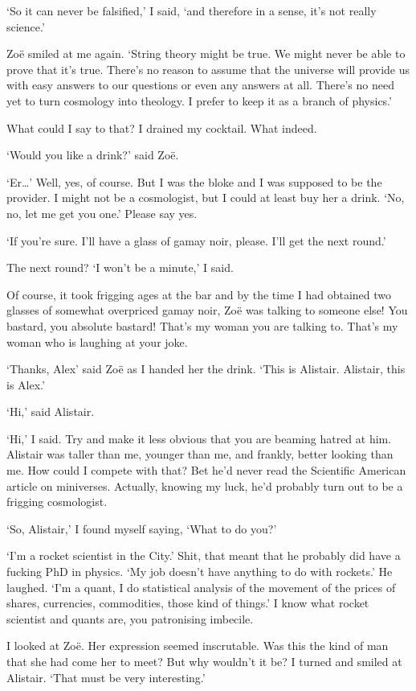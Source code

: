 `So it can never be falsified,' I said, `and therefore in a sense,
it's not really science.'

Zoë smiled at me again. `String theory might be true. We might
never be able to prove that it's true. There's no reason to assume
that the universe will provide us with easy answers to our questions
or even any answers at all. There's no need yet to turn cosmology
into theology. I prefer to keep it as a branch of physics.'

What could I say to that? I drained my cocktail. What indeed.

`Would you like a drink?' said Zoë.

`Er\dots' Well, yes, of course. But I was the bloke and I was
supposed to be the provider. I might not be a cosmologist, but I
could at least buy her a drink. `No, no, let me get you one.' Please
say yes.

`If you're sure. I'll have a glass of gamay noir, please. I'll get
the next round.'

The next round? `I won't be a minute,' I said.

Of course, it took frigging ages at the bar and by the time I had
obtained two glasses of somewhat overpriced gamay noir, Zoë was
talking to someone else! You bastard, you absolute bastard! That's
{\twelveit my\/} woman you are talking to. That's {\twelveit my\/}
woman who is laughing at your joke.

`Thanks, Alex' said Zoë as I handed her the drink. `This is
Alistair. Alistair, this is Alex.'

`Hi,' said Alistair.

`Hi,' I said. Try and make it less obvious that you are beaming
hatred at him. Alistair was taller than me, younger than me, and
frankly, better looking than me. How could I compete with that? Bet
he'd never read the {\twelvesl Scientific American\/} article on
miniverses. Actually, knowing my luck, he'd probably turn out to be
a frigging cosmologist.

`So, Alistair,' I found myself saying, `What to do you?'

`I'm a rocket scientist in the City.' Shit, that meant that he
probably did have a fucking PhD in physics. `My job doesn't have
anything to do with rockets.' He laughed. `I'm a quant, I do
statistical analysis of the movement of the prices of shares,
currencies, commodities, those kind of things.' I know what rocket
scientist and quants are, you patronising imbecile.

I looked at Zoë. Her expression seemed inscrutable. Was this the
kind of man that she had come her to meet? But why wouldn't it be? I
turned and smiled at Alistair. `That must be very interesting.'

